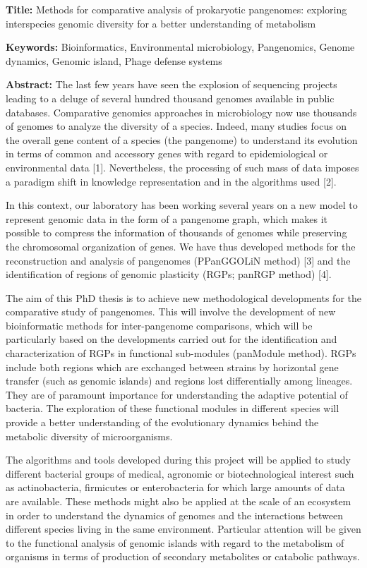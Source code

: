 \begin{mdframed}[linecolor=Prune,linewidth=1]

\textbf{Title:} Methods for comparative analysis of prokaryotic pangenomes: exploring interspecies genomic diversity for a better understanding of metabolism

\noindent \textbf{Keywords:} Bioinformatics, Environmental microbiology, Pangenomics, Genome dynamics, Genomic island, Phage defense systems

\begin{multicols}{2}
\noindent \textbf{Abstract:} The last few years have seen the explosion of sequencing projects leading to a deluge of several hundred thousand genomes available in public databases. Comparative genomics approaches in microbiology now use thousands of genomes to analyze the diversity of a species. Indeed, many studies focus on the overall gene content of a species (the pangenome) to understand its evolution in terms of common and accessory genes with regard to epidemiological or environmental data [1]. Nevertheless, the processing of such mass of data imposes a paradigm shift in knowledge representation and in the algorithms used [2].

In this context, our laboratory has been working several years on a new model to represent genomic data in the form of a pangenome graph, which makes it possible to compress the information of thousands of genomes while preserving the chromosomal organization of genes. We have thus developed methods for the reconstruction and analysis of pangenomes (PPanGGOLiN method) [3] and the identification of regions of genomic plasticity (RGPs; panRGP method) [4].

The aim of this PhD thesis is to achieve new methodological developments for the comparative study of pangenomes. This will involve the development of  new bioinformatic methods for inter-pangenome comparisons, which will be particularly based on the developments carried out for the identification and characterization of RGPs in functional sub-modules (panModule method). RGPs include both regions which are exchanged between strains by horizontal gene transfer (such as genomic islands) and regions lost differentially among lineages. They are of paramount importance for understanding the adaptive potential of bacteria. The exploration of these functional modules in different species will provide a better understanding of the evolutionary dynamics behind the metabolic diversity of microorganisms.

The algorithms and tools developed during this project will be applied to study different bacterial groups of medical, agronomic or biotechnological interest such as actinobacteria, firmicutes or enterobacteria for which large amounts of data are available. These methods might also be applied at the scale of an ecosystem in order to understand the dynamics of genomes and the interactions between different species living in the same environment. Particular attention will be given to the functional analysis of genomic islands with regard to the metabolism of organisms in terms of production of secondary metabolites or catabolic pathways.


\end{multicols}
\end{mdframed}
